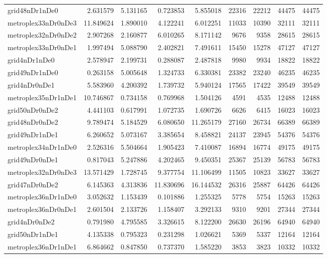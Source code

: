 \begin{longtable}{|l|r|r|r|r|r|r|r|r|}
grid48nDr1nDe0 & 2.631579 & 5.131165 & 0.723853 & 5.855018 & 22316 & 22212 & 44475 & 44475 \\
metroplex33nDr0nDe3 & 11.849624 & 1.890010 & 4.122241 & 6.012251 & 11033 & 10390 & 32111 & 32111 \\
metroplex32nDr0nDe2 & 2.907268 & 2.160877 & 6.010265 & 8.171142 & 9676 & 9358 & 28615 & 28615 \\
metroplex33nDr0nDe1 & 1.997494 & 5.088790 & 2.402821 & 7.491611 & 15450 & 15278 & 47127 & 47127 \\
grid4nDr1nDe0 & 2.578947 & 2.199731 & 0.288087 & 2.487818 & 9980 & 9934 & 18822 & 18822 \\
grid49nDr1nDe0 & 0.263158 & 5.005648 & 1.324733 & 6.330381 & 23382 & 23240 & 46235 & 46235 \\
grid4nDr0nDe1 & 5.583960 & 4.200392 & 1.739732 & 5.940124 & 17565 & 17422 & 39549 & 39549 \\
metroplex35nDr1nDe1 & 10.746867 & 0.734158 & 0.769968 & 1.504126 & 4591 & 4535 & 12488 & 12488 \\
grid50nDr0nDe2 & 4.441103 & 0.617991 & 1.072735 & 1.690726 & 6626 & 6415 & 16023 & 16023 \\
grid48nDr0nDe2 & 9.789474 & 5.184529 & 6.080650 & 11.265179 & 27160 & 26734 & 66389 & 66389 \\
grid49nDr1nDe1 & 6.260652 & 5.073167 & 3.385654 & 8.458821 & 24137 & 23945 & 54376 & 54376 \\
metroplex34nDr1nDe0 & 2.526316 & 5.504664 & 1.905423 & 7.410087 & 16894 & 16774 & 49175 & 49175 \\
grid49nDr0nDe1 & 0.817043 & 5.247886 & 4.202465 & 9.450351 & 25367 & 25139 & 56783 & 56783 \\
metroplex32nDr0nDe3 & 13.571429 & 1.728745 & 9.377754 & 11.106499 & 11505 & 10823 & 33627 & 33627 \\
grid47nDr0nDe2 & 6.145363 & 4.313836 & 11.830696 & 16.144532 & 26316 & 25887 & 64426 & 64426 \\
metroplex36nDr1nDe0 & 3.052632 & 1.153439 & 0.101886 & 1.255325 & 5778 & 5754 & 15263 & 15263 \\
metroplex36nDr0nDe1 & 2.601504 & 2.133726 & 1.158407 & 3.292133 & 9310 & 9201 & 27344 & 27344 \\
grid4nDr0nDe2 & 0.791980 & 4.795585 & 3.326615 & 8.122200 & 26630 & 26196 & 64940 & 64940 \\
grid50nDr1nDe1 & 4.135338 & 0.795323 & 0.231298 & 1.026621 & 5369 & 5337 & 12164 & 12164 \\
metroplex36nDr1nDe1 & 6.864662 & 0.847850 & 0.737370 & 1.585220 & 3853 & 3823 & 10332 & 10332 \\

\end{longtable}
